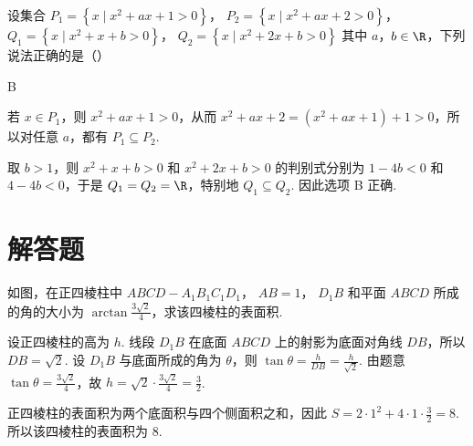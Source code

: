 \begin{problem}
设集合 \( P_1 = \left\{ x \mid x^2 + ax + 1 > 0 \right\} \)， \( P_2 = \left\{ x \mid x^2 + ax + 2 > 0 \right\} \)， \( Q_1 = \left\{ x \mid x^2 + x + b > 0 \right\} \)， \( Q_2 = \left\{ x \mid x^2 + 2x + b > 0 \right\} \) 其中 \(a\)，\(b \in \R\)，下列说法正确的是（\quad）


\begin{answer}
B
\end{answer}

\begin{solution}
若 \(x\in P_1\)，则 \(x^2+ax+1>0\)，从而 \(x^2+ax+2=(x^2+ax+1)+1>0\)，所以对任意 \(a\)，都有 \(P_1\subseteq P_2\).

取 \(b>1\)，则 \(x^2+x+b>0\) 和 \(x^2+2x+b>0\) 的判别式分别为 \(1-4b<0\) 和 \(4-4b<0\)，于是 \(Q_1=Q_2=\R\)，特别地 \(Q_1\subseteq Q_2\). 因此选项 B 正确.
\end{solution}
\end{problem}

\section{解答题}

\begin{problem}
如图，在正四棱柱中 \( ABCD-A_{1}B_{1}C_{1}D_{1} \)， \( AB=1 \)， \(D_{1}B\) 和平面 \(ABCD\) 所成的角的大小为 \( \arctan\frac{3\sqrt{2}}{4} \)，求该四棱柱的表面积.

\begin{solution}
设正四棱柱的高为 \(h\). 线段 \(D_1B\) 在底面 \(ABCD\) 上的射影为底面对角线 \(DB\)，所以 \(DB=\sqrt2\). 设 \(D_1B\) 与底面所成的角为 \(\theta\)，则 \(\tan\theta=\frac{h}{DB}=\frac{h}{\sqrt2}\). 由题意 \(\tan\theta=\frac{3\sqrt2}{4}\)，故 \(h=\sqrt2\cdot\frac{3\sqrt2}{4}=\frac32\).

正四棱柱的表面积为两个底面积与四个侧面积之和，因此 \(S=2\cdot1^2+4\cdot1\cdot\frac32=8\). 所以该四棱柱的表面积为 \(8\).
\end{solution}
\end{problem}

